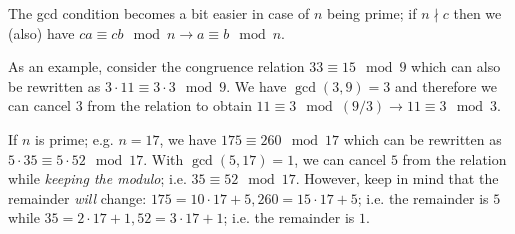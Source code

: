The gcd condition becomes a bit easier in case of $n$ being prime; if $n \nmid c$ then we (also) have $c a \equiv cb \mod n \rightarrow a \equiv b \mod n$.

As an example, consider the congruence relation $33 \equiv 15 \mod 9$ which can also be rewritten as $3 \cdot 11 \equiv 3 \cdot 3 \mod 9$. We have $\gcd(3, 9) = 3$ and therefore we can cancel $3$ from the relation to obtain $11 \equiv 3 \mod (9/3) \rightarrow 11 \equiv 3 \mod 3$.

If $n$ is prime; e.g. $n = 17$, we have $175 \equiv 260 \mod 17$ which can be rewritten as $5 \cdot 35 \equiv 5 \cdot 52 \mod 17$. With $\gcd(5, 17) = 1$, we can cancel $5$ from the relation while \emph{keeping the modulo}; i.e. $35 \equiv 52 \mod 17$. However, keep in mind that the remainder \emph{will} change: $175 = 10 \cdot 17 + 5, 260 = 15 \cdot 17 + 5$; i.e. the remainder is $5$ while $35 = 2 \cdot 17 + 1, 52 = 3 \cdot 17 + 1$; i.e. the remainder is $1$.


